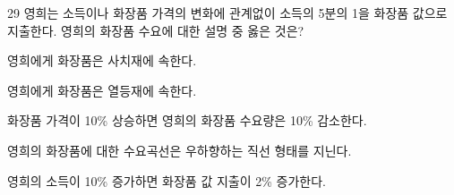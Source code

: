 \begin{question}{29}
영희는 소득이나 화장품 가격의 변화에 관계없이 소득의 5분의 1을 화장품 값으로 지출한다. 영희의 화장품 수요에 대한 설명 중 옳은 것은?
\begin{choices}
  \item 영희에게 화장품은 사치재에 속한다.
  \item 영희에게 화장품은 열등재에 속한다.
  \item 화장품 가격이 10\% 상승하면 영희의 화장품 수요량은 10\% 감소한다.
  \item 영희의 화장품에 대한 수요곡선은 우하향하는 직선 형태를 지닌다.
  \item 영희의 소득이 10\% 증가하면 화장품 값 지출이 2\% 증가한다.
\end{choices}
\end{question}
